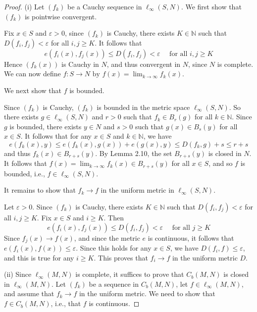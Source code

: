 \documentclass[a4paper]{article}
\begin{document}
\begin{proof}
    (i) Let $\left(f_k\right)$ be a Cauchy sequence in $\ell_{\infty}(S, N)$. We first show that $\left(f_k\right)$ is pointwise convergent. 
    
    Fix $x \in S$ and $\varepsilon>0$, since $\left(f_k\right)$ is Cauchy, there exists $K \in \mathbb{N}$ such that $D\left(f_i, f_j\right)<\varepsilon$ for all $i, j \geqslant K$. It follows that
    \[
    e\left(f_i(x), f_j(x)\right) \leqslant D\left(f_i, f_j\right)<\varepsilon \quad \text { for all } i, j \geqslant K
    \]
    Hence $\left(f_k(x)\right)$ is Cauchy in $N$, and thus convergent in $N$, since $N$ is complete. We can now define $ f: S \rightarrow N \text { by } f(x)=\lim _{k \rightarrow \infty} f_k(x) $.

    We next show that $f$ is bounded. 
    
    Since $ (f_k)$ is Cauchy, $\left(f_k\right)$ is bounded in the metric space $\ell_{\infty}(S, N)$. So there exists $g \in \ell_{\infty}(S, N)$ and $r>0$ such that $f_k \in B_r(g)$ for all $k \in \mathbb{N}$. Since $g$ is bounded, there exists $y \in N$ and $s>0$ such that $g(x) \in B_s(y)$ for all $x \in S$. It follows that for any $x \in S$ and $k \in \mathbb{N}$, we have
    \[
    e\left(f_k(x), y\right) \leqslant e\left(f_k(x), g(x)\right)+e(g(x), y) \leqslant D\left(f_k, g\right)+s \leqslant r+s
    \]
    and thus $f_k(x) \in B_{r+s}(y)$. By Lemma 2.10, the set $B_{r+s}(y)$ is closed in $N$. It follows that $f(x)=\lim _{k \rightarrow \infty} f_k(x) \in B_{r+s}(y)$ for all $x \in S$, and so $f$ is bounded, i.e., $f \in \ell_{\infty}(S, N)$.

    It remains to show that $f_k \rightarrow f$ in the uniform metric in $\ell_{\infty}(S, N)$. 
    
    Let $\varepsilon>0$. Since $\left(f_k\right)$ is Cauchy, there exists $K \in \mathbb{N}$ such that $D\left(f_i, f_j\right)<\varepsilon$ for all $i, j \geqslant K$. Fix $x \in S$ and $i \geqslant K$. Then
    \[
    e\left(f_i(x), f_j(x)\right) \leqslant D\left(f_i, f_j\right)<\varepsilon \quad \text { for all } j \geqslant K
    \]
    Since $f_j(x) \rightarrow f(x)$, and since the metric $e$ is continuous, it follows that $e\left(f_i(x), f(x)\right) \leqslant \varepsilon$. Since this holds for any $x \in S$, we have $D\left(f_i, f\right) \leqslant \varepsilon$, and this is true for any $i \geqslant K$. This proves that $f_i \rightarrow f$ in the uniform metric $D$.
    
    (ii) Since $\ell_{\infty}(M, N)$ is complete, it suffices to prove that $C_b(M, N)$ is closed in $\ell_{\infty}(M, N)$. Let $\left(f_k\right)$ be a sequence in $C_b(M, N)$, let $f \in \ell_{\infty}(M, N)$, and assume that $f_k \rightarrow f$ in the uniform metric. We need to show that $f \in C_b(M, N)$, i.e., that $f$ is continuous.


\end{proof}
\end{document}
